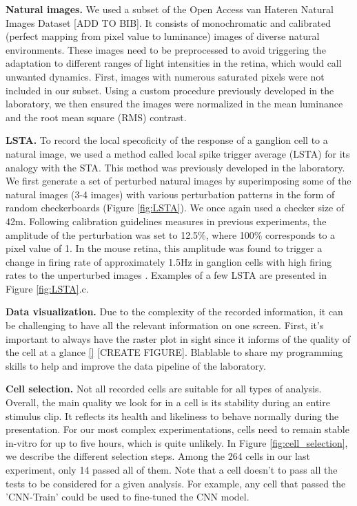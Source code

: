
\textbf{Natural images.}
We used a subset of the Open Access van Hateren Natural Images Dataset [ADD TO
        BIB]. It consists of monochromatic and calibrated (perfect mapping from
pixel
value to luminance) images of diverse natural environments. These images need
to
be preprocessed to avoid triggering the adaptation to different ranges of light
intensities in the retina, which would call unwanted
dynamics. First, images with numerous saturated pixels were not included in our
subset. Using a custom procedure previously developed in the laboratory, we
then
ensured the images were normalized in the mean luminance and the root mean
square (RMS) contrast.

\textbf{LSTA.}
To record the local specoficity of the response of a ganglion cell to a natural
image, we used a method called local spike trigger average (LSTA) for its
analogy with the STA. This method was previously developed in the laboratory.
We first generate a set of perturbed natural images by superimposing some of
the natural images (3-4 images) with various perturbation patterns in the form
of random checkerboards (Figure \ref{fig:LSTA}). We once again used a checker
size of 42\textmu m.
Following calibration guidelines measures in previous experiments, the
amplitude of the perturbation was set to 12.5\%, where 100\% corresponds to a
pixel value of 1. In the mouse retina, this amplitude was found to trigger a
change in firing rate of approximately 1.5Hz in ganglion cells with high firing
rates to the unperturbed images \citep{goldin_context-dependent_2022}.
Examples of a few LSTA are presented in Figure \ref{fig:LSTA}.c.

\textbf{Data visualization.}
Due to the complexity of the recorded information, it can be challenging to
have
all the relevant information on one screen. First, it's important to always
have the raster plot in sight since it informs of the quality of the cell at a
glance \ref{} [CREATE FIGURE].
Blablable to share my programming skills to help and improve the data pipeline
of the laboratory.



\textbf{Cell selection.}
Not all recorded cells are suitable for all types of analysis. Overall, the
main quality we look for in a cell is its stability during an entire stimulus
clip.
It reflects its health and likeliness to behave normally during the
presentation. For our most complex experimentations, cells need to remain
stable in-vitro for up to five hours, which is quite unlikely. In Figure
\ref{fig:cell_selection}, we
describe the different selection steps. Among the 264 cells
in our last experiment, only 14 passed all of them. Note that a cell doesn't to
pass all the tests to be considered for a given analysis. For example, any cell
that passed the 'CNN-Train' could be used to fine-tuned the CNN model.

